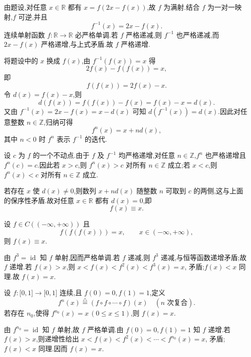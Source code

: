 \begin{solution}
    由题设,对任意 $x\in\mathbb{R}$ 都有 $x=f(2x-f(x))$,故 $f$ 为满射.结合 $f$ 为一对一映射,$f$ 可逆,并且
    \[
        f^{-1}(x)=2x-f(x).
    \]
    连续单射函数 $f:\mathbb{R}\to\mathbb{R}$ 必严格单调.若 $f$ 严格递减,则 $f^{-1}$ 也严格递减,而 $2x-f(x)$ 严格递增,与上式矛盾.故 $f$ 严格递增.

    将题设中的 $x$ 换成 $f(x)$,由 $f^{-1}(f(x))=x$ 得
    \[
        2f(x)-f(f(x))=x,
    \]
    即
    \[
        f(f(x))=2f(x)-x.
    \]
    令 $d(x)=f(x)-x$,则
    \[
        d(f(x))=f(f(x))-f(x)=f(x)-x=d(x).
    \]
    又由 $f^{-1}(x)=2x-f(x)=x-d(x)$ 可知 $d(f^{-1}(x))=d(x)$.因此对任意整数 $n\in\mathbb{Z}$,归纳可得
    \[
        f^n(x)=x+nd(x),
    \]
    其中 $n<0$ 时 $f^n$ 表示 $f^{-1}$ 的迭代.

    设 $c$ 为 $f$ 的一个不动点.由于 $f$ 及 $f^{-1}$ 均严格递增,对任意 $n\in\mathbb{Z}$,$f^n$ 也严格递增且 $f^n(c)=c$.因此若 $x>c$,则 $f^n(x)>c$ 对所有 $n\in\mathbb{Z}$ 成立;若 $x<c$,则 $f^n(x)<c$ 对所有 $n\in\mathbb{Z}$ 成立.

    若存在 $x$ 使 $d(x)\neq0$,则数列 $x+nd(x)$ 随整数 $n$ 可取到 $c$ 的两侧,这与上面的保序性矛盾.故对任意 $x\in\mathbb{R}$ 都有 $d(x)=0$,即
    \[
        f(x)\equiv x.
    \]
\end{solution}

\begin{example}
    设 $f\in C(( -\infty,+\infty))$ 且
    \[
        f(f(f(x)))=x, \qquad x\in(-\infty,+\infty),
    \]
    则 $f(x)\equiv x$.
\end{example}
\exampleblank

\begin{solution}
    由 $f^3=\operatorname{id}$ 知 $f$ 单射,因而严格单调.若 $f$ 递减,则 $f^3$ 递减,与恒等函数递增矛盾;故 $f$ 递增.若 $f(x)>x$,则 $x<f(x)<f^2(x)<f^3(x)=x$,
    矛盾;$f(x)<x$ 同理.故 $f(x)=x$.
\end{solution}

\begin{example}
    设 $f:\lbrack 0,1\rbrack\to\lbrack 0,1\rbrack$ 连续,且 $f(0)=0,f(1)=1$,定义
    \[
        f^n(x)\overset{\triangle}{=}(f\circ f\circ\cdots\circ f)(x) \quad(n\text{ 次复合}).
    \]
    若存在 $n_0$,使得 $f^{n_0}(x)=x\,(0\leq x\leq1)$,则 $f(x)=x$.
\end{example}
\exampleblank

\begin{solution}
    由 $f^{n_0}=\operatorname{id}$ 知 $f$ 单射,故 $f$ 严格单调.由 $f(0)=0,f(1)=1$ 知 $f$ 递增.若 $f(x)>x$,则递增性给出 $x<f(x)<f^2(x)<\cdots<f^{n_0}(x)=x$,
    矛盾;$f(x)<x$ 同理.因而 $f(x)=x$.
\end{solution}

